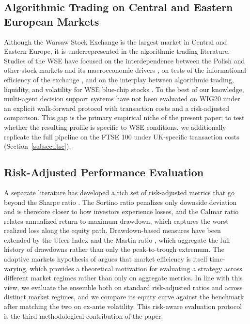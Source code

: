 \documentclass{ieeeaccess}
\begin{document}
\subsection{Algorithmic Trading on Central and Eastern European Markets}

Although the Warsaw Stock Exchange is the largest market in Central and Eastern Europe, it is underrepresented in the algorithmic trading literature. Studies of the WSE have focused on the interdependence between the Polish and other stock markets and its macroeconomic drivers \cite{czapkiewicz2018}, on tests of the informational efficiency of the exchange \cite{kompa2009}, and on the interplay between algorithmic trading, liquidity, and volatility for WSE blue-chip stocks \cite{gurgul2025}. To the best of our knowledge, multi-agent decision support systems have not been evaluated on WIG20 under an explicit walk-forward protocol with transaction costs and a risk-adjusted comparison. This gap is the primary empirical niche of the present paper; to test whether the resulting profile is specific to WSE conditions, we additionally replicate the full pipeline on the FTSE 100 under UK-specific transaction costs (Section~\ref{subsec:ftse}).

\subsection{Risk-Adjusted Performance Evaluation}

A separate literature has developed a rich set of risk-adjusted metrics that go beyond the Sharpe ratio \cite{sharpe1966}. The Sortino ratio \cite{sortino1994} penalizes only downside deviation and is therefore closer to how investors experience losses, and the Calmar ratio \cite{young1991} relates annualized return to maximum drawdown, which captures the worst realized loss along the equity path. Drawdown-based measures have been extended by the Ulcer Index and the Martin ratio \cite{martin1989}, which aggregate the full history of drawdowns rather than only the peak-to-trough extremum. The adaptive markets hypothesis of \cite{lo2004} argues that market efficiency is itself time-varying, which provides a theoretical motivation for evaluating a strategy across different market regimes rather than only on aggregate metrics. In line with this view, we evaluate the ensemble both on standard risk-adjusted ratios and across distinct market regimes, and we compare its equity curve against the benchmark after matching the two on ex-ante volatility. This risk-aware evaluation protocol is the third methodological contribution of the paper.
\end{document}
